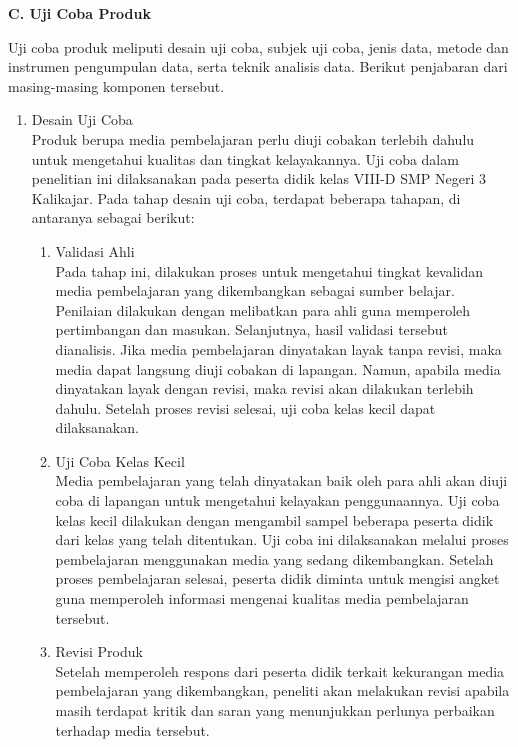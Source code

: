 \documentclass[12pt]{article}
\begin{document}
\textbf{C. Uji Coba Produk}

\hspace*{1cm}Uji coba produk meliputi desain uji coba, subjek uji coba, jenis data, metode dan instrumen pengumpulan data, serta teknik analisis data. Berikut penjabaran dari masing-masing komponen tersebut.
\begin{enumerate}
    \item Desain Uji Coba\\
    \hspace*{1cm}Produk berupa media pembelajaran perlu diuji cobakan terlebih dahulu untuk mengetahui kualitas dan tingkat kelayakannya. Uji coba dalam penelitian ini dilaksanakan pada peserta didik kelas VIII-D SMP Negeri 3 Kalikajar. Pada tahap desain uji coba, terdapat beberapa tahapan, di antaranya sebagai berikut:
    \begin{enumerate}
        \item Validasi Ahli\\
        \hspace*{1cm}Pada tahap ini, dilakukan proses untuk mengetahui tingkat kevalidan media pembelajaran yang dikembangkan sebagai sumber belajar. Penilaian dilakukan dengan melibatkan para ahli guna memperoleh pertimbangan dan masukan. Selanjutnya, hasil validasi tersebut dianalisis. Jika media pembelajaran dinyatakan layak tanpa revisi, maka media dapat langsung diuji cobakan di lapangan. Namun, apabila media dinyatakan layak dengan revisi, maka revisi akan dilakukan terlebih dahulu. Setelah proses revisi selesai, uji coba kelas kecil dapat dilaksanakan.
        \item Uji Coba Kelas Kecil\\
        \hspace*{1cm}Media pembelajaran yang telah dinyatakan baik oleh para ahli akan diuji coba di lapangan untuk mengetahui kelayakan penggunaannya. Uji coba kelas kecil dilakukan dengan mengambil sampel beberapa peserta didik dari kelas yang telah ditentukan. Uji coba ini dilaksanakan melalui proses pembelajaran menggunakan media yang sedang dikembangkan. Setelah proses pembelajaran selesai, peserta didik diminta untuk mengisi angket guna memperoleh informasi mengenai kualitas media pembelajaran tersebut.
        \item Revisi Produk\\
        \hspace*{1cm}Setelah memperoleh respons dari peserta didik terkait kekurangan media pembelajaran yang dikembangkan, peneliti akan melakukan revisi apabila masih terdapat kritik dan saran yang menunjukkan perlunya perbaikan terhadap media tersebut.

\end{enumerate}
\end{enumerate}
\end{document}
